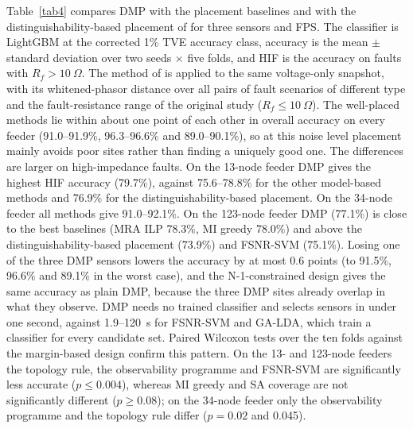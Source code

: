 \documentclass[11pt]{article}
\newenvironment{nw}{}{}
\begin{document}
\begin{nw}

Table~\ref{tab4} compares DMP with the placement baselines and with the distinguishability-based placement of \cite{kaliuzhnyi2027statistical} for three sensors and FPS. The classifier is LightGBM at the corrected 1\% TVE accuracy class, accuracy is the mean $\pm$ standard deviation over two seeds $\times$ five folds, and HIF is the accuracy on faults with $R_f>10~\Omega$. The method of \cite{kaliuzhnyi2027statistical} is applied to the same voltage-only snapshot, with its whitened-phasor distance over all pairs of fault scenarios of different type and the fault-resistance range of the original study ($R_f\le10~\Omega$). The well-placed methods lie within about one point of each other in overall accuracy on every feeder (91.0--91.9\%, 96.3--96.6\% and 89.0--90.1\%), so at this noise level placement mainly avoids poor sites rather than finding a uniquely good one. The differences are larger on high-impedance faults. On the 13-node feeder DMP gives the highest HIF accuracy (79.7\%), against 75.6--78.8\% for the other model-based methods and 76.9\% for the distinguishability-based placement. On the 34-node feeder all methods give 91.0--92.1\%. On the 123-node feeder DMP (77.1\%) is close to the best baselines (MRA ILP 78.3\%, MI greedy 78.0\%) and above the distinguishability-based placement (73.9\%) and FSNR-SVM (75.1\%). Losing one of the three DMP sensors lowers the accuracy by at most 0.6 points (to 91.5\%, 96.6\% and 89.1\% in the worst case), and the N-1-constrained design gives the same accuracy as plain DMP, because the three DMP sites already overlap in what they observe. DMP needs no trained classifier and selects sensors in under one second, against 1.9--120~s for FSNR-SVM and GA-LDA, which train a classifier for every candidate set. Paired Wilcoxon tests over the ten folds against the margin-based design confirm this pattern. On the 13- and 123-node feeders the topology rule, the observability programme and FSNR-SVM are significantly less accurate ($p\le0.004$), whereas MI greedy and SA coverage are not significantly different ($p\ge0.08$); on the 34-node feeder only the observability programme and the topology rule differ ($p=0.02$ and 0.045).

\end{nw}
\end{document}
